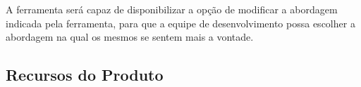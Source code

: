 	A ferramenta será capaz de disponibilizar a opção de modificar a abordagem indicada pela ferramenta, para que a equipe de desenvolvimento possa escolher a abordagem na qual os mesmos se sentem mais a vontade.

\subsection{Recursos do Produto}

